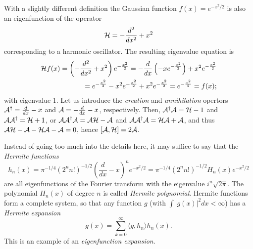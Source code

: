 With a slightly different definition the Gaussian function $f(x) = e^{-{x^2/2}}$ is also an eigenfunction of the operator
\begin{equation}
{\cal H} = - \frac{d^2}{d x^2} + x ^2
\label{2012-m-ch-fa-hphoe}
\end{equation}
corresponding to a harmonic oscillator.
The resulting eigenvalue equation is
\begin{equation}
\begin{split}
{\cal H} f(x) = \left(- \frac{d^2}{d x^2} +  x^2 \right) e^{-\frac{x^2}{2}}
=  -\frac{d }{d x }\left(-  x e^{-\frac{x^2}{2}} \right) +  x^2 e^{-\frac{x^2}{2}}  \\
=  e^{-\frac{x^2}{2}} -  x^2 e^{-\frac{x^2}{2}}  +  x^2 e^{-\frac{x^2}{2}}
= e^{-\frac{x^2}{2}}
=  f(x);
\label{2012-m-ch-fa-hphoeee}
\end{split}
\end{equation}
with eigenvalue $1$.
Let us introduce the
{\em creation}
and
{\em annihilation}
opertors
${\cal A}^\dagger =  \frac{d}{d x} -  x$
and
${\cal A}  =  - \frac{d}{d x} -  x$,
respectively.
Then,
${\cal A}^\dagger {\cal A}= {\cal H} -1$ and
${\cal A} {\cal A}^\dagger = {\cal H} +1$,
or
${\cal A}{\cal A}^\dagger {\cal A}= {\cal A}{\cal H} -{\cal A}$ and
${\cal A} {\cal A}^\dagger {\cal A}= {\cal H}{\cal A} +{\cal A}$,
and thus
$ {\cal A}{\cal H} -{\cal A} - {\cal H}{\cal A} - {\cal A} = 0$,
hence
$ [{\cal A},{\cal H}] = 2{\cal A}$.
\fi

Instead of going too much into the details here, it may suffice to say
that the
{\em Hermite functions}
\begin{equation}
h_n(x) =\pi^{-1/4}(2^n n!)^{-1/2}\left(  \frac{d}{dx} -x\right)^n e^{-{x^2/2}}
= \pi^{-1/4}(2^n n!)^{-1/2} H_n(x) e^{-{x^2/2}}
\end{equation}
are all eigenfunctions of the Fourier transform with the eigenvalue $i^n \sqrt{2\pi }$.
The polynomial $H_n(x)$ of degree $n$ is called {\em Hermite polynomial}. 
Hermite functions form a complete system, so that any function $g$ (with $\int \vert g (x) \vert^2 dx <\infty$) has a
{\em Hermite expansion}
\begin{equation}
g(x) = \sum_{k=0}^\infty \langle g , h_n\rangle h_n(x)
.
\end{equation}
This is an example of an
{\em eigenfunction expansion}.
